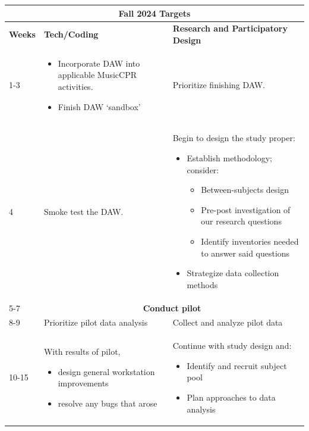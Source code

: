 \documentclass[manuscript,screen,review]{acmart}
\begin{document}
\begin{center}
    \begin{tabular}{ |p{1cm}||p{6.5cm}|p{6.5cm}| }
    \hline
    \multicolumn{3}{|c|}{\textbf{Fall 2024 Targets}} \\
    \hline
           \textbf{Weeks}
         & \textbf{Tech/Coding}
         & \textbf{Research and Participatory Design} \\
    \hline
    1-3
    & 
    \begin{itemize}[leftmargin=*]
        \item Incorporate DAW into applicable MusicCPR activities.
        \item Finish DAW `sandbox'
    \end{itemize}
    & 
    Prioritize finishing DAW. \\
    \hline
    4
    &
        Smoke test the DAW.
    &
    Begin to design the study proper:
    \begin{itemize}
        \item Establish methodology; consider:
            \begin{itemize}
                \item Between-subjects design
                \item Pre-post investigation of our research questions
                \item Identify inventories needed to answer said questions
            \end{itemize}
        \item Strategize data collection methods
    \end{itemize} \\
    \hline
    5-7
    &
    \multicolumn{2}{|c|}{\textbf{Conduct pilot}} \\
    \hline
    8-9
    &
    Prioritize pilot data analysis
    &
    Collect and analyze pilot data \\
    \hline
    10-15
    &
    With results of pilot,
    \begin{itemize}
        \item design general workstation improvements
        \item resolve any bugs that arose
    \end{itemize}
    &
    Continue with study design and:
        \begin{itemize}
            \item Identify and recruit subject pool
            \item Plan approaches to data analysis
        \end{itemize} \\
    \hline
    \end{tabular}
\end{center}
\end{document}
